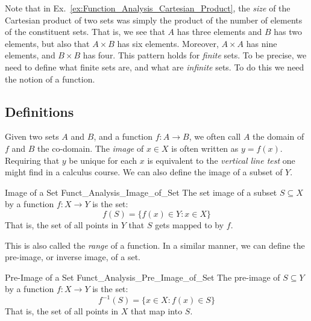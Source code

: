             Note that in
            Ex.~\ref{ex:Function_Analysis_Cartesian_Product}, the
            \textit{size} of the Cartesian product of two sets
            was simply the product of the number of elements of
            the constituent sets. That is, we see that $A$ has
            three elements and $B$ has two elements, but also that
            $A\times{B}$ has six elements. Moreover, $A\times{A}$
            has nine elements, and $B\times{B}$ has four. This
            pattern holds for \textit{finite} sets. To be precise,
            we need to define what finite sets are, and what
            are \textit{infinite} sets. To do this we need the
            notion of a function.
        \subsection{Definitions}
            Given two sets $A$ and $B$, and a function
            $f:A\rightarrow{B}$, we often call $A$ the
            domain of $f$ and $B$ the co-domain.
            The \textit{image} of $x\in{X}$ is often written
            as $y=f(x)$. Requiring that $y$ be unique for each
            $x$ is equivalent to the \textit{vertical line test}
            one might find in a calculus course. We can also
            define the image of a subset of $Y$.
            \begin{ldefinition}{Image of a Set}
                  {Funct_Analysis_Image_of_Set}
                The \gls{set image} of a subset
                $S\subseteq{X}$ by a function
                $f:X\rightarrow{Y}$ is the set:
                \begin{equation}
                    f(S)=\{f(x)\in{Y}:x\in{X}\}
                \end{equation}
                That is, the set of all points in $Y$ that $S$
                gets mapped to by $f$.
            \end{ldefinition}
            This is also called the \textit{range} of a function.
            In a similar manner, we can define the pre-image, or
            inverse image, of a set.
            \begin{ldefinition}{Pre-Image of a Set}
                  {Funct_Analysis_Pre_Image_of_Set}
                The \gls{pre-image} of $S\subseteq{Y}$
                by a function $f:X\rightarrow{Y}$ is the set:
                \begin{equation}
                    f^{\minus{1}}(S)=\{x\in{X}:f(x)\in{S}\}
                \end{equation}
                That is, the set of all points in $X$ that map
                into $S$.
            \end{ldefinition}

